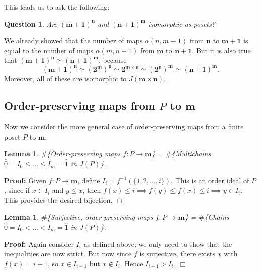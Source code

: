 \documentclass[11pt]{article}
\newtheorem{lemma}[theorem]{Lemma}
\newtheorem{question}[theorem]{Question}
\newenvironment{proof}{\noindent \textbf{Proof:}}{$\Box$}
\newcommand{\cm}{\mathbf{m}} %
\begin{document}
This leads us to ask the following:

\begin{question} Are $\mathbf{(m+1)}^{\mathbf{n}}$ and $\mathbf{(n+1)}^{\mathbf{m}}$ isomorphic as posets? \end{question}

We already showed that the number of maps $\alpha(n,m+1)$ from $\mathbf{n}$ to $\mathbf{m+1}$ is equal to the number of maps $\alpha(m,n+1)$ from $\mathbf{m}$ to $\mathbf{n+1}$. But it is also true that $\mathbf{(m+1)}^{\mathbf{n}} \simeq \mathbf{(n+1)}^{\mathbf{m}}$, because
$$\mathbf{(m+1)}^{\mathbf{n}} \simeq \left(\mathbf{2}^{\mathbf{m}}\right)^{\mathbf{n}} \simeq \mathbf{2}^{\mathbf{m} \times \mathbf{n}} \simeq \left(\mathbf{2}^{\mathbf{n}}\right)^{\mathbf{m}} \simeq \mathbf{(n+1)}^{\mathbf{m}}.$$ Moreover, all of these are isomorphic to $J(\mathbf{m} \times \mathbf{n}).$

\subsection{Order-preserving maps from $P$ to $\mathbf{m}$}

Now we consider the more general case of order-preserving maps from a finite poset $P$ to $\mathbf{m}.$ 

\begin{lemma} $\#$\{Order-preserving maps $f: P \rightarrow \mathbf{m}$\} = $\#$\{Multichains $\hat{0} = I_0 \le \ldots \le I_m = \hat{1}$ in $J(P)$\}. \end{lemma}
\begin{proof} Given $f: P \rightarrow \cm$, define $I_i = f^{-1}(\{1,2,\ldots,i\}).$ This is an order ideal of $P$, since if $x \in I_i$ and $y \le x$, then $f(x) \le i \implies f(y) \le f(x) \le i \implies y \in I_i$. This provides the desired bijection. \end{proof}

\begin{lemma} $\#$\{Surjective, order-preserving maps $f: P \rightarrow \mathbf{m}$\} = $\#$\{Chains $\hat{0} = I_0 < \ldots < I_m = \hat{1}$ in $J(P)$\}. \end{lemma}
\begin{proof} Again consider $I_i$ as defined above; we only need to show that the inequalities are now strict. But now since $f$ is surjective, there exists $x$ with $f(x) = i+1$, so $x \in I_{i+1}$ but $x \notin I_i$. Hence $I_{i+1} > I_i.$ \end{proof}
\end{document}

